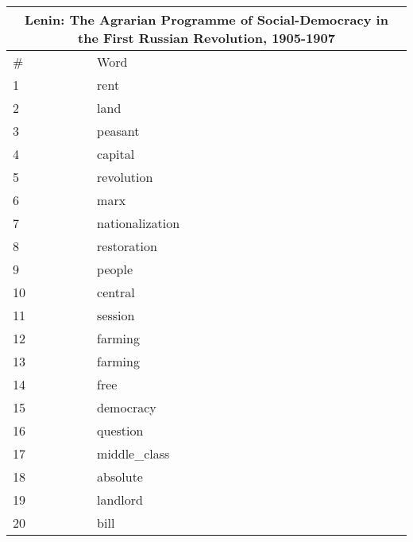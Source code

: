 
    \begin{center}
      \begin{tabular}{ | l | l | }
        \hline
        \multicolumn{2}{|c|}{Lenin: The Agrarian Programme of Social-Democracy in the First Russian Revolution, 1905-1907} \\ \hline
        \# & Word  \\ \hline
1 & rent \\ \hline 
2 & land \\ \hline 
3 & peasant \\ \hline 
4 & capital \\ \hline 
5 & revolution \\ \hline 
6 & marx \\ \hline 
7 & nationalization \\ \hline 
8 & restoration \\ \hline 
9 & people \\ \hline 
10 & central \\ \hline 
11 & session \\ \hline 
12 & farming \\ \hline 
13 & farming \\ \hline 
14 & free \\ \hline 
15 & democracy \\ \hline 
16 & question \\ \hline 
17 & middle_class \\ \hline 
18 & absolute \\ \hline 
19 & landlord \\ \hline 
20 & bill \\ \hline 

      \end{tabular}
    \end{center}
            